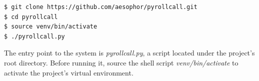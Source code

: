 

\begin{lstlisting}[numbers=none,xleftmargin=0em,caption={Shell commands to checkout and run PyRollCall}]
$ git clone https://github.com/aesophor/pyrollcall.git
$ cd pyrollcall
$ source venv/bin/activate
$ ./pyrollcall.py 
\end{lstlisting}

The entry point to the system is \emph{pyrollcall.py}, a script located under the project's root directory.
Before running it, source the shell script \emph{venv/bin/activate} to activate the project's virtual environment.
